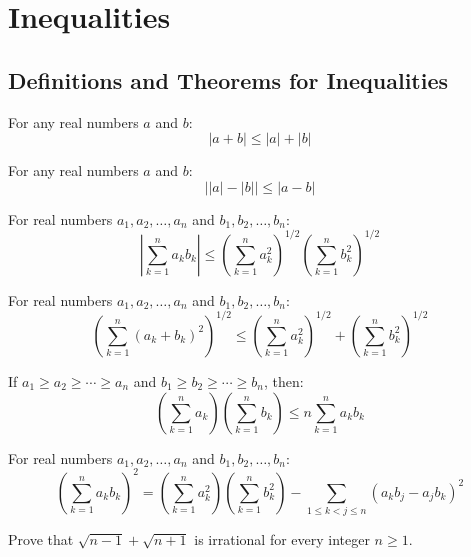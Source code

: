 \section{Inequalities}

\subsection*{Definitions and Theorems for Inequalities}

\begin{theorem}
For any real numbers $a$ and $b$:
\[
|a + b| \leq |a| + |b|
\]
\end{theorem}

\begin{theorem}
For any real numbers $a$ and $b$:
\[
\big| |a| - |b| \big| \leq |a - b|
\]
\end{theorem}

\begin{theorem}
For real numbers $a_1, a_2, \ldots, a_n$ and $b_1, b_2, \ldots, b_n$:
\[
\left| \sum_{k=1}^n a_k b_k \right| \leq \left( \sum_{k=1}^n a_k^2 \right)^{1/2} \left( \sum_{k=1}^n b_k^2 \right)^{1/2}
\]
\end{theorem}

\begin{theorem}
For real numbers $a_1, a_2, \ldots, a_n$ and $b_1, b_2, \ldots, b_n$:
\[
\left( \sum_{k=1}^n (a_k + b_k)^2 \right)^{1/2} \leq \left( \sum_{k=1}^n a_k^2 \right)^{1/2} + \left( \sum_{k=1}^n b_k^2 \right)^{1/2}
\]
\end{theorem}

\begin{theorem}
If $a_1 \geq a_2 \geq \cdots \geq a_n$ and $b_1 \geq b_2 \geq \cdots \geq b_n$, then:
\[
\left( \sum_{k=1}^n a_k \right) \left( \sum_{k=1}^n b_k \right) \leq n \sum_{k=1}^n a_k b_k
\]
\end{theorem}

\begin{theorem}
For real numbers $a_1, a_2, \ldots, a_n$ and $b_1, b_2, \ldots, b_n$:
\[
\left( \sum_{k=1}^n a_k b_k \right)^2 = \left( \sum_{k=1}^n a_k^2 \right) \left( \sum_{k=1}^n b_k^2 \right) - \sum_{1 \leq k < j \leq n} (a_k b_j - a_j b_k)^2
\]
\end{theorem}

\begin{problembox}
Prove that $\sqrt{n - 1} + \sqrt{n + 1}$ is irrational for every integer $n \geq 1$.
\end{problembox}

